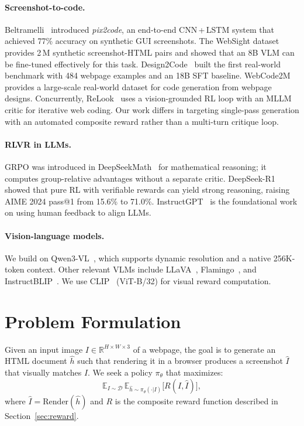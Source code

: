 \documentclass[10pt,twocolumn,letterpaper]{article}
\begin{document}
\paragraph{Screenshot-to-code.}
Beltramelli~\citep{beltramelli2018pix2code} introduced \textit{pix2code}, an
end-to-end CNN\,+\,LSTM system that achieved 77\% accuracy on synthetic GUI
screenshots.  The WebSight dataset~\citep{huggingface2024websight} provides
2\,M synthetic screenshot-HTML pairs and showed that an 8B VLM can be
fine-tuned effectively for this task.  Design2Code~\citep{si2025design2code}
built the first real-world benchmark with 484 webpage examples and an 18B SFT
baseline.  WebCode2M~\citep{webcode2m2024} provides a large-scale real-world
dataset for code generation from webpage designs.  Concurrently, ReLook~\citep{relook2025}
uses a vision-grounded RL loop with an MLLM critic for iterative web coding.
Our work differs in targeting single-pass generation with an automated
composite reward rather than a multi-turn critique loop.

\paragraph{RLVR in LLMs.}
GRPO was introduced in DeepSeekMath~\citep{shao2024deepseekmath} for
mathematical reasoning; it computes group-relative advantages without a
separate critic.  DeepSeek-R1~\citep{deepseek2025r1} showed that pure RL with
verifiable rewards can yield strong reasoning, raising AIME 2024
pass@1 from 15.6\% to 71.0\%.  InstructGPT~\citep{ouyang2022instructgpt}
is the foundational work on using human feedback to align LLMs.

\paragraph{Vision-language models.}
We build on Qwen3-VL~\citep{qwen3vl2025}, which supports dynamic resolution
and a native 256K-token context.  Other relevant VLMs include
LLaVA~\citep{liu2023llava}, Flamingo~\citep{alayrac2022flamingo}, and
InstructBLIP~\citep{dai2023instructblip}.  We use CLIP~\citep{radford2021clip}
(ViT-B/32) for visual reward computation.

\section{Problem Formulation}

Given an input image $I \in \mathbb{R}^{H \times W \times 3}$ of a webpage,
the goal is to generate an HTML document $\hat{h}$ such that rendering it in a
browser produces a screenshot $\hat{I}$ that visually matches $I$.
We seek a policy $\pi_\theta$ that maximizes:
\[
  \mathbb{E}_{I \sim \mathcal{D}}\,\mathbb{E}_{\hat{h} \sim \pi_\theta(\cdot|I)}
  \bigl[R(I, \hat{I})\bigr],
\]
where $\hat{I} = \text{Render}(\hat{h})$ and $R$ is the composite reward
function described in Section~\ref{sec:reward}.
\end{document}

